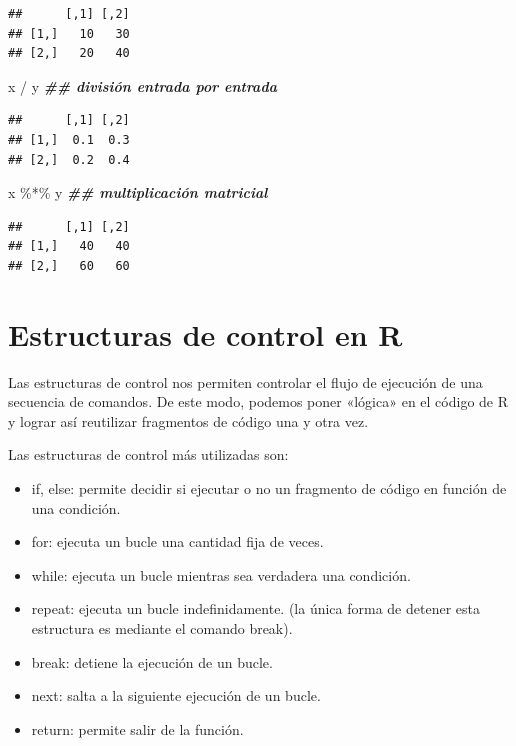 \documentclass[
  12pt,
]{book}
\newenvironment{Shaded}{\begin{snugshade}}{\end{snugshade}}
\newcommand{\DocumentationTok}[1]{\textcolor[rgb]{0.56,0.35,0.01}{\textbf{\textit{#1}}}}
\newcommand{\NormalTok}[1]{#1}
\newcommand{\SpecialCharTok}[1]{\textcolor[rgb]{0.00,0.00,0.00}{#1}}
\providecommand{\tightlist}{%
  \setlength{\itemsep}{0pt}\setlength{\parskip}{0pt}}
\begin{document}
\begin{verbatim}
##      [,1] [,2]
## [1,]   10   30
## [2,]   20   40
\end{verbatim}

\begin{Shaded}
\begin{Highlighting}[]
\NormalTok{x }\SpecialCharTok{/}\NormalTok{ y }\DocumentationTok{\#\# división entrada por entrada}
\end{Highlighting}
\end{Shaded}

\begin{verbatim}
##      [,1] [,2]
## [1,]  0.1  0.3
## [2,]  0.2  0.4
\end{verbatim}

\begin{Shaded}
\begin{Highlighting}[]
\NormalTok{x }\SpecialCharTok{\%*\%}\NormalTok{ y }\DocumentationTok{\#\# multiplicación matricial}
\end{Highlighting}
\end{Shaded}

\begin{verbatim}
##      [,1] [,2]
## [1,]   40   40
## [2,]   60   60
\end{verbatim}

\hypertarget{estructuras-de-control-en-r}{%
\chapter{\texorpdfstring{\textbf{Estructuras de control en R}}{Estructuras de control en R}}\label{estructuras-de-control-en-r}}

Las estructuras de control nos permiten controlar el flujo de ejecución de una secuencia de comandos.
De este modo, podemos poner «lógica» en el código de R y lograr así reutilizar fragmentos de código una y otra vez.

Las estructuras de control más utilizadas son:

\begin{itemize}
\tightlist
\item
  if, else: permite decidir si ejecutar o no un fragmento de código en función de una condición.
\item
  for: ejecuta un bucle una cantidad fija de veces.
\item
  while: ejecuta un bucle mientras sea verdadera una condición.
\item
  repeat: ejecuta un bucle indefinidamente. (la única forma de detener esta estructura es mediante el comando break).
\item
  break: detiene la ejecución de un bucle.
\item
  next: salta a la siguiente ejecución de un bucle.
\item
  return: permite salir de la función.
\end{itemize}
\end{document}
